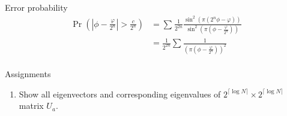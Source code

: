 \documentclass{beamer}
\newcommand\emm[1]{\textcolor{redorange}{{#1}}}
\begin{document}
\begin{frame}{Error probability}
\begin{align*}
\Pr\left(\left|\phi - \frac{\varphi}{2^n}\right| > \frac{c}{2^n}\right)
&=\sum_{} \frac1{2^{2n}}\frac{\sin^2\left(\pi\left(2^n\phi - \varphi\right)\right)}{\sin^2\left(\pi\left(\phi - \frac{\varphi}{2^n}\right)\right)}\\
&= \frac1{2^{2n}}\sum_{}\frac{1}{\left(\pi\left(\phi - \frac{\varphi}{2^n}\right)\right)^2}\\
\end{align*}
\end{frame}
\fi



\begin{frame}{Assignments}
\begin{enumerate}
\setlength{\itemsep}{2em}
\item Show \emm{all} eigenvectors and corresponding eigenvalues of $2^{\lceil \log N\rceil}\times 2^{\lceil\log N\rceil}$ matrix $U_a$.
\end{enumerate}
\end{frame}
\end{document}
